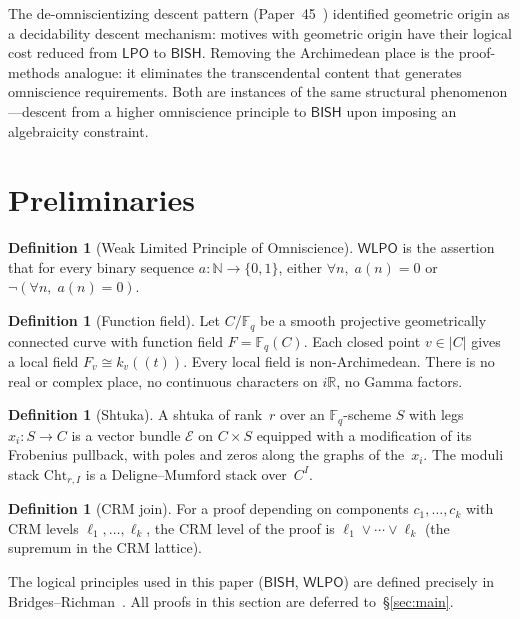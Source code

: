\documentclass[11pt]{article}
\theoremstyle{plain}
\theoremstyle{definition}
\newtheorem{definition}[theorem]{Definition}
\theoremstyle{remark}
\newcommand{\N}{\mathbb{N}}
\newcommand{\R}{\mathbb{R}}
\newcommand{\Fq}{\mathbb{F}_q}
\newcommand{\Cht}{\mathrm{Cht}}
\newcommand{\BISH}{\mathsf{BISH}}
\newcommand{\LPO}{\mathsf{LPO}}
\newcommand{\WLPO}{\mathsf{WLPO}}
\begin{document}
The de-omniscientizing descent pattern (Paper~45~\cite{Paper45}) identified
geometric origin as a decidability descent mechanism: motives with geometric
origin have their logical cost reduced from $\LPO$ to $\BISH$. Removing the
Archimedean place is the proof-methods analogue: it eliminates the
transcendental content that generates omniscience requirements. Both are
instances of the same structural phenomenon---descent from a higher omniscience
principle to $\BISH$ upon imposing an algebraicity constraint.

\section{Preliminaries}\label{sec:prelim}

\begin{definition}[Weak Limited Principle of Omniscience]
$\WLPO$ is the assertion that for every binary sequence $a : \N \to \{0,1\}$,
either $\forall n,\; a(n) = 0$ or $\lnot(\forall n,\; a(n) = 0)$.
\end{definition}

\begin{definition}[Function field]
Let $C/\Fq$ be a smooth projective geometrically connected curve with function
field $F = \Fq(C)$. Each closed point $v \in |C|$ gives a local field
$F_v \cong k_v((t))$. Every local field is non-Archimedean. There is no real
or complex place, no continuous characters on $i\R$, no Gamma factors.
\end{definition}

\begin{definition}[Shtuka]
A shtuka of rank~$r$ over an $\Fq$-scheme $S$ with legs $x_i : S \to C$ is a
vector bundle $\mathcal{E}$ on $C \times S$ equipped with a modification of its
Frobenius pullback, with poles and zeros along the graphs of the~$x_i$. The
moduli stack $\Cht_{r,I}$ is a Deligne--Mumford stack over~$C^I$.
\end{definition}

\begin{definition}[CRM join]
For a proof depending on components $c_1, \ldots, c_k$ with CRM levels
$\ell_1, \ldots, \ell_k$, the CRM level of the proof is
$\ell_1 \vee \cdots \vee \ell_k$ (the supremum in the CRM lattice).
\end{definition}

\noindent
The logical principles used in this paper ($\BISH$, $\WLPO$) are defined
precisely in Bridges--Richman~\cite{BridgesRichman1987}. All proofs in this
section are deferred to~\S\ref{sec:main}.
\end{document}
